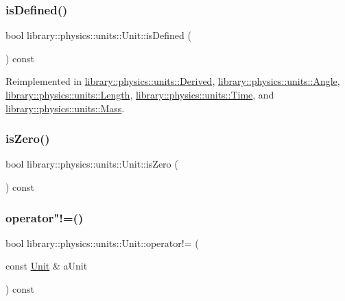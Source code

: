 \subsubsection{\texorpdfstring{is\+Defined()}{isDefined()}}
{\footnotesize\ttfamily bool library\+::physics\+::units\+::\+Unit\+::is\+Defined (\begin{DoxyParamCaption}{ }\end{DoxyParamCaption}) const\hspace{0.3cm}{\ttfamily [virtual]}}



Reimplemented in \hyperlink{classlibrary_1_1physics_1_1units_1_1_derived_a26c20c57fc3a7c2fb2ff215d6d4687a2}{library\+::physics\+::units\+::\+Derived}, \hyperlink{classlibrary_1_1physics_1_1units_1_1_angle_a77c7849734ce02b55e070fb88fd87f71}{library\+::physics\+::units\+::\+Angle}, \hyperlink{classlibrary_1_1physics_1_1units_1_1_length_a0249a542e7cc613e6a39275b4e37bd05}{library\+::physics\+::units\+::\+Length}, \hyperlink{classlibrary_1_1physics_1_1units_1_1_time_ab62163386c3253277c5ba71782261cad}{library\+::physics\+::units\+::\+Time}, and \hyperlink{classlibrary_1_1physics_1_1units_1_1_mass_a0efde6eb08d6b79baa84229746776b6a}{library\+::physics\+::units\+::\+Mass}.

\mbox{\label{classlibrary_1_1physics_1_1units_1_1_unit_a034d99479240b780ab15dbc9eec629f0}} 
\subsubsection{\texorpdfstring{is\+Zero()}{isZero()}}
{\footnotesize\ttfamily bool library\+::physics\+::units\+::\+Unit\+::is\+Zero (\begin{DoxyParamCaption}{ }\end{DoxyParamCaption}) const}

\mbox{\label{classlibrary_1_1physics_1_1units_1_1_unit_a68d7c6e97c9748b43b55b5f74e0f9cda}} 
\subsubsection{\texorpdfstring{operator"!=()}{operator!=()}}
{\footnotesize\ttfamily bool library\+::physics\+::units\+::\+Unit\+::operator!= (\begin{DoxyParamCaption}\item[{const \hyperlink{classlibrary_1_1physics_1_1units_1_1_unit}{Unit} \&}]{a\+Unit }\end{DoxyParamCaption}) const}

